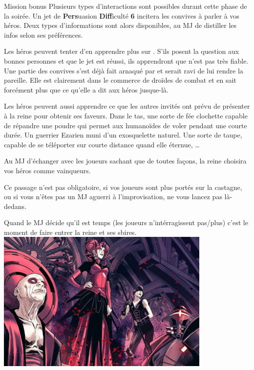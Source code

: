 \begin{paperbox}{Mission bonus}
Plusieurs types d’interactions sont possibles durant cette phase de la soirée. Un jet de \textbf{Pers}uasion \textbf{Diff}iculté \textbf{6} incitera les convives à parler à vos héros. Deux types d’informations sont alors disponibles, au MJ de distiller les infos selon ses préférences.

Les héros peuvent tenter d’en apprendre plus sur . S’ils posent la question aux bonnes personnes et que le jet est réussi, ils apprendront que  n’est pas très fiable. Une partie des convives s’est déjà fait arnaqué par  et serait ravi de lui rendre la pareille. Elle est clairement dans le commerce de droïdes de combat et en sait forcément plus que ce qu’elle a dit aux héros jusque-là.

Les héros peuvent aussi apprendre ce que les autres invités ont prévu de présenter à la reine pour obtenir ses faveurs. Dans le tas, une sorte de fée clochette capable de répandre une poudre qui permet aux humanoïdes de voler pendant une courte durée. Un guerrier Ezarien muni d’un exosquelette naturel. Une sorte de taupe, capable de se téléporter sur courte distance quand elle éternue, \dots

Au MJ d’échanger avec les joueurs sachant que de toutes façons, la reine choisira vos héros comme vainqueurs.

Ce passage n’est pas obligatoire, si vos joueurs sont plus portés sur la castagne, ou si vous n’êtes pas un MJ aguerri à l’improvisation, ne vous lancez pas là-dedans.
\end{paperbox}

Quand le MJ décide qu’il est temps (les joueurs n’intérragissent pas/plus) c’est le moment de faire entrer la reine et ses sbires.\\

\noindent\includegraphics[width=\linewidth]{_img/places/queen-with-minions.jpg}

